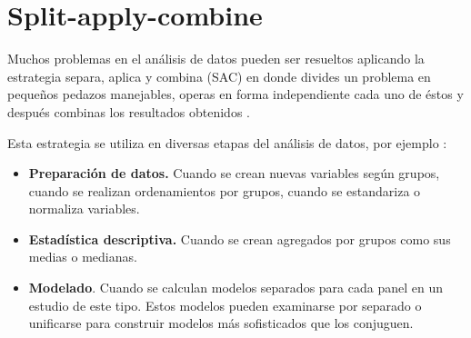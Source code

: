 \documentclass[]{article}
\newenvironment{Shaded}{\begin{snugshade}}{\end{snugshade}}
\newcommand{\KeywordTok}[1]{\textcolor[rgb]{0.13,0.29,0.53}{\textbf{{#1}}}}
\newcommand{\DecValTok}[1]{\textcolor[rgb]{0.00,0.00,0.81}{{#1}}}
\newcommand{\FloatTok}[1]{\textcolor[rgb]{0.00,0.00,0.81}{{#1}}}
\newcommand{\StringTok}[1]{\textcolor[rgb]{0.31,0.60,0.02}{{#1}}}
\newcommand{\NormalTok}[1]{{#1}}
\begin{document}
\begin{Shaded}
\end{Shaded}

\newpage

\section{Split-apply-combine}\label{split-apply-combine}

Muchos problemas en el análisis de datos pueden ser resueltos aplicando
la estrategia separa, aplica y combina (SAC) en donde divides un
problema en pequeños pedazos manejables, operas en forma independiente
cada uno de éstos y después combinas los resultados obtenidos
\parencite{wickham2011split}.

Esta estrategia se utiliza en diversas etapas del análisis de datos, por
ejemplo \parencite{wickham2011split}:

\begin{itemize}
\itemsep1pt\parskip0pt
\item
  \textbf{Preparación de datos.} Cuando se crean nuevas variables según
  grupos, cuando se realizan ordenamientos por grupos, cuando se
  estandariza o normaliza variables.
\item
  \textbf{Estadística descriptiva.} Cuando se crean agregados por grupos
  como sus medias o medianas.
\item
  \textbf{Modelado}. Cuando se calculan modelos separados para cada
  panel en un estudio de este tipo. Estos modelos pueden examinarse por
  separado o unificarse para construir modelos más sofisticados que los
  conjuguen.
\end{itemize}
\end{document}
